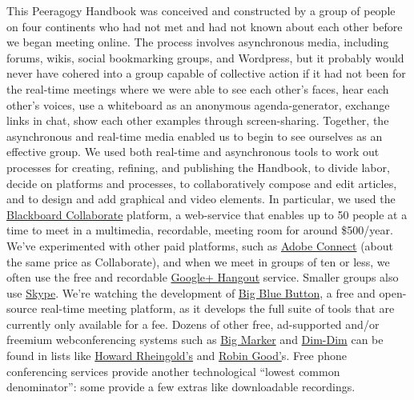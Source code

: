 This Peeragogy Handbook was conceived and constructed by a group of
people on four continents who had not met and had not known about each
other before we began meeting online. The process involves asynchronous
media, including forums, wikis, social bookmarking groups, and
Wordpress, but it probably would never have cohered into a group capable
of collective action if it had not been for the real-time meetings where
we were able to see each other's faces, hear each other's voices, use a
whiteboard as an anonymous agenda-generator, exchange links in chat,
show each other examples through screen-sharing. Together, the
asynchronous and real-time media enabled us to begin to see ourselves as
an effective group. We used both real-time and asynchronous tools to
work out processes for creating, refining, and publishing the Handbook,
to divide labor, decide on platforms and processes, to collaboratively
compose and edit articles, and to design and add graphical and video
elements. In particular, we used the
\href{http://www.blackboard.com/platforms/collaborate/overview.aspx}{Blackboard
Collaborate} platform, a web-service that enables up to 50 people at a
time to meet in a multimedia, recordable, meeting room for around
\$500/year. We've experimented with other paid platforms, such as
\href{http://success.adobe.com/en/na/sem/products/connect/1109\_6011\_connect\_webinars.html}{Adobe
Connect} (about the same price as Collaborate), and when we meet in
groups of ten or less, we often use the free and recordable
\href{http://www.google.com/+/learnmore/hangouts/}{Google+ Hangout}
service. Smaller groups also use \href{http://www.skype.com}{Skype}.
We're watching the development of
\href{http://www.bigbluebutton.org/}{Big Blue Button}, a free and
open-source real-time meeting platform, as it develops the full suite of
tools that are currently only available for a fee. Dozens of other free,
ad-supported and/or freemium webconferencing systems such as
\href{http://www.bigmarker.com/about}{Big Marker} and
\href{http://www.dimdim.com}{Dim-Dim} can be found in lists like
\href{http://delicious.com/hrheingold/webconferencing}{Howard
Rheingold's} and
\href{http://www.mindmeister.com/12213323/best-online-collaboration-tools-2012-robin-good-s-collaborative-map}{Robin
Good'}s. Free phone conferencing services provide another technological
``lowest common denominator'': some provide a few extras like
downloadable recordings.

